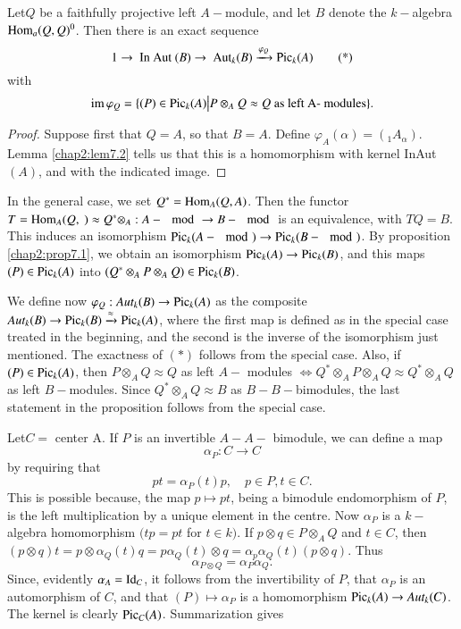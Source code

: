 \setcounter{prop}{2}
\begin{prop}\label{chap2:prop7.3}%
Let\pageoriginale $Q$ be a faithfully projective left $A-$module, and
let $B$ denote the $k-$algebra $\operatorname{Hom}_a(Q, Q)^0$. Then there is an
exact sequence  
\begin{equation*}
1 \to \text{ In Aut } (B) \to  \text{ Aut} _k(B)
\xrightarrow{\varphi_Q} \operatorname{Pic}_k (A) \tag{*} 
\end{equation*}
with
$$
\operatorname{im} \varphi_Q = \{ (P) \in \operatorname{Pic}_k (A) \big|  P \otimes_A Q \approx Q
\text{ as left A- modules} \}. 
$$
\end{prop}

\begin{proof}
Suppose first that $Q = A$, so that $B = A$. Define $\varphi_A
(\alpha) = (_1 A_{\alpha})$. Lemma \ref{chap2:lem7.2} tells us that
this is a homomorphism with kernel InAut $(A)$, and with the indicated
image.  
\end{proof}

In the general case, we set $Q^* = \operatorname{Hom}_A (Q, A)$. Then the functor $T =
\operatorname{Hom}_A (Q, ~)\approx Q^* \otimes_A : A- \mod \to B- \mod$ is an
equivalence, with $TQ = B$. This induces an isomorphism $\operatorname{Pic}_k(A-
\mod) \rightarrow \operatorname{Pic}_k(B- \mod)$. By proposition
\ref{chap2:prop7.1}, we obtain an 
isomorphism $\operatorname{Pic}_k (A) \to \operatorname{Pic}_k (B)$, and this maps $(P) \in \operatorname{Pic}_k
(A)$ into $(Q^* \otimes_A P \otimes_A Q) \in \operatorname{Pic}_k (B)$. 

We define now $\varphi_Q : Aut_k(B) \to \operatorname{Pic}_k(A)$ as the composite
$Aut_k(B) \to \operatorname{Pic}_k (B) \xrightarrow{\approx} \operatorname{Pic}_k (A)$, where the
first map is defined as in the special case treated in the beginning,
and the second is the inverse of the isomorphism just mentioned. The
exactness of $(*)$ follows from the special case. Also, if $(P) \in
\operatorname{Pic}_k (A)$, then $P \otimes_A Q \approx Q$ as left $A-$ modules
$\Leftrightarrow Q^* \otimes_A P \otimes_A Q \approx Q^* \otimes_A Q$
as left  $B-$modules. Since $Q^* \otimes_A Q \approx B$ as
$B-B-$bimodules, the last statement in the proposition follows from
the special case.  

Let\pageoriginale $C = $ center A. If $P$ is an invertible $A-A-$
bimodule, we can define a map  
$$
\alpha_P : C \to C
$$
by requiring that  
$$
pt = \alpha_P(t)p, \quad p \in P, t \in C. 
$$
This is possible because, the map $p \mapsto pt$, being a bimodule
endomorphism of $P$, is the left multiplication by a unique element in
the centre. Now $\alpha_P$ is a $k-$algebra homomorphism $(tp = pt$
for $t \in k)$. If $p \otimes q \in P \otimes_A Q$ and $t \in C$, then
$(p \otimes q) t = p \otimes \alpha_Q (t) q = p \alpha_Q (t) \otimes q
= \alpha_p \alpha_Q (t) (p \otimes q)$. Thus 
$$
\alpha_{P \otimes Q} = \alpha_P \alpha_Q. 
$$
Since, evidently $\alpha_A = \operatorname{Id}_C$, it follows from the invertibility
of $P$, that $\alpha_P$ is an automorphism of $C$, and that $(P)
\mapsto \alpha_P$ is a homomorphism $\operatorname{Pic}_k(A) \to Aut_k(C)$. The
kernel is clearly $\operatorname{Pic}_C(A)$. Summarization gives 

